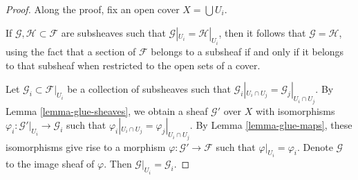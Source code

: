 \begin{proof}
	Along the proof, fix an open cover $X=\bigcup U_i$.
	
	\medskip\noindent
	If $\mathcal{G},\mathcal{H}\subset\mathcal{F}$ are subsheaves such that $\mathcal{G}|_{U_i}=\mathcal{H}|_{U_i}$, then it follows that $\mathcal{G}=\mathcal{H}$, using the fact that a section of $\mathcal{F}$ belongs to a subsheaf if and only if it belongs to that subsheaf when restricted to the open sets of a cover.
	
	\medskip\noindent
	Let $\mathcal{G}_i\subset\mathcal{F}|_{U_i}$ be a collection of subsheaves such that $\mathcal{G}_i|_{U_i\cap U_j}=\mathcal{G}_j|_{U_i\cap U_j}$. By Lemma \ref{lemma-glue-sheaves}, we obtain a sheaf $\mathcal{G}'$ over $X$ with isomorphisms $\varphi_i:\mathcal{G}'|_{U_i}\to\mathcal{G}_i$ such that $\varphi_i|_{U_i\cap U_j}=\varphi_j|_{U_i\cap U_j}$. By Lemma \ref{lemma-glue-maps}, these isomorphisms give rise to a morphism $\varphi:\mathcal{G}'\to\mathcal{F}$ such that $\varphi|_{U_i}=\varphi_i$. Denote $\mathcal{G}$ to the image sheaf of $\varphi$. Then $\mathcal{G}|_{U_i}=\mathcal{G}_i$.
\end{proof}











